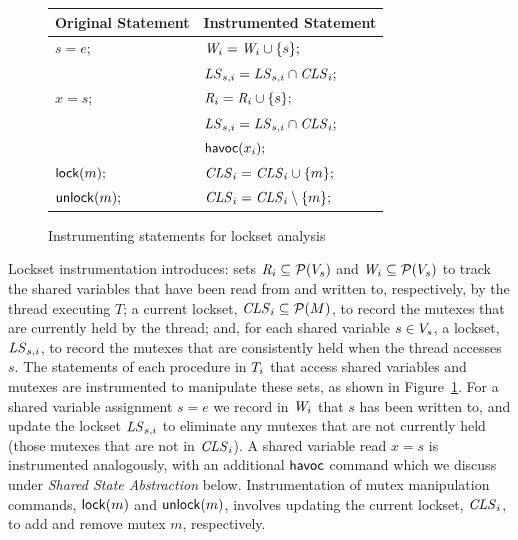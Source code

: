 \begin{figure}
\footnotesize
\center
\begin{tabular}{ll}
\textbf{Original Statement} & \textbf{Instrumented Statement} \\
\toprule

$s = e;$ & $\mathit{W}_{i} = \mathit{W}_{i} \cup \{ s \};$ \\
         & $\mathit{LS}_{s,i} = \mathit{LS}_{s,i} \cap \mathit{CLS}_{i};$ \\
\midrule
         
$x = s;$ & $\mathit{R}_{i} = \mathit{R}_{i} \cup \{ s \};$ \\
         & $\mathit{LS}_{s,i} = \mathit{LS}_{s,i} \cap \mathit{CLS}_{i};$ \\
         & $\mathsf{havoc}({x_{i}});$ \\
\midrule
         
$\mathsf{lock}(m);$   & $\mathit{CLS}_{i} = \mathit{CLS}_{i} \cup \{ m \};$ \\
\midrule

$\mathsf{unlock}(m);$ & $\mathit{CLS}_{i} = \mathit{CLS}_{i} \setminus \{ m \};$ \\
\bottomrule
\end{tabular}
\caption{Instrumenting statements for lockset analysis}
\label{fig:instrumentation}
\end{figure}

Lockset instrumentation introduces: sets $\mathit{R}_{i} \subseteq \mathcal{P}(V_s)$ and $\mathit{W}_{i} \subseteq \mathcal{P}(V_s)$ to track the shared variables that have been read from and written to, respectively, by the thread executing $T$; a current lockset, $\mathit{CLS}_{i} \subseteq \mathcal{P}(M)$, to record the mutexes that are currently held by the thread; and, for each shared variable $s \in V_s$, a lockset, $\mathit{LS}_{s,i}$, to record the mutexes that are consistently held when the thread accesses $s$.
%
The statements of each procedure in $T_{i}$ that access shared variables and mutexes are instrumented to manipulate these sets, as shown in Figure~\ref{fig:instrumentation}.  For a shared variable assignment $s = e$ we record in $\mathit{W}_{i}$ that $s$ has been written to, and update the lockset $\mathit{LS}_{s,i}$ to eliminate any mutexes that are not currently held (those mutexes that are not in $\mathit{CLS}_{i}$).  A shared variable read $x = s$ is instrumented analogously, with an additional $\mathsf{havoc}$ command which we discuss under \emph{Shared State Abstraction} below.  Instrumentation of mutex manipulation commands, $\mathsf{lock}(m)$ and $\mathsf{unlock}(m)$, involves updating the current lockset, $\mathit{CLS}_{i}$, to add and remove mutex $m$, respectively.


